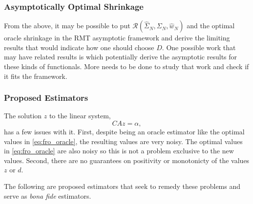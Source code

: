 \documentclass{article}
\begin{document}
\subsubsection{Asymptotically Optimal Shrinkage}

From the above, it may be possible to put $\mathcal{R}(\hat{\Sigma}_N,
\Sigma_N, \hat{w}_N)$ and the optimal oracle shrinkage in the RMT asymptotic
framework and derive the limiting results that would indicate how one should
choose $D$.  One possible work that may have related results is
\cite{Mestre2008Improved} which potentially derive the asymptotic results for
these kinds of functionals.  More needs to be done to study that work and check
if it fits the framework.

\subsubsection{Proposed Estimators}

The solution $z$ to the linear system,
$$
	C A z = \alpha,
$$
has a few issues with it.  First, despite being an oracle estimator like the
optimal values in \eqref{eq:fro_oracle}, the resulting values are very noisy.
The optimal values in \eqref{eq:fro_oracle} are also noisy so this is not a
problem exclusive to the new values.  Second, there are no guarantees on
positivity or monotonicty of the values $z$ or $d$.

The following are proposed estimators that seek to remedy these problems and
serve as \emph{bona fide} estimators.
\end{document}
